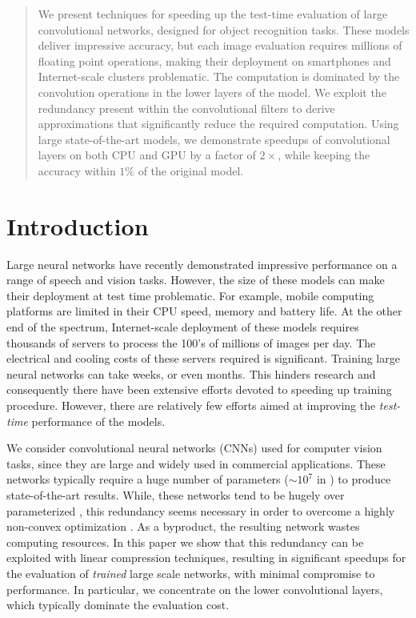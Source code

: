 \begin{abstract}
  We present techniques for speeding up the test-time evaluation of
  large convolutional networks, designed for object recognition
  tasks. These models deliver impressive accuracy, but each image
  evaluation requires millions of floating point operations, making
  their deployment on smartphones and Internet-scale clusters
  problematic. The computation is dominated by the convolution
  operations in the lower layers of the model. We exploit the redundancy
  present within the convolutional filters to derive
  approximations that significantly reduce the required
  computation. Using large state-of-the-art models, we demonstrate
  speedups of convolutional layers on both CPU and GPU by a factor of $2\times$, while keeping the accuracy
  within $1\%$ of the original model.
\end{abstract}

\section{Introduction}

Large neural networks have recently demonstrated impressive
performance on a range of speech and vision tasks. However, the size of
these models can make their deployment at test time problematic. For
example, mobile computing platforms are limited in their CPU speed,
memory and battery life. At the other end of the spectrum,
Internet-scale deployment of these models requires thousands of
servers to process the 100's of millions of images per day. The
electrical and cooling costs of these servers required is significant.
Training large neural networks can take weeks, or even
months. This hinders research and consequently there have been
extensive efforts devoted to speeding up training procedure.  However,
there are relatively few efforts aimed at improving the {\em test-time}
performance of the models. 

 We consider convolutional neural networks (CNNs) used for computer vision tasks, since
they are large and widely used in commercial applications. 
These networks typically require a huge number of parameters ($\sim 10^{7}$ in \cite{sermanet2013overfeat})
to produce state-of-the-art results. 
While, these networks tend to be hugely over parameterized \cite{denil2013predicting}, this redundancy seems necessary in order
to overcome a highly non-convex optimization \cite{hinton2012improving}. 
As a byproduct, the resulting network wastes computing resources.
In this paper we show that this redundancy can be 
exploited with linear compression techniques,
resulting in significant speedups for the evaluation of {\em trained}
large scale networks, with minimal compromise to performance.
In particular, we concentrate on the lower convolutional layers, which 
typically dominate the evaluation cost. 

